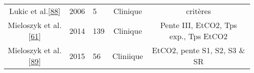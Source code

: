 \documentclass[12pt,]{article}
\begin{document}
\begin{landscape}
\begin{longtable}[]{@{}cllcc@{}}
\begin{minipage}[t]{0.31\columnwidth}\centering
Lukic et al.{[}\protect\hyperlink{ref-lukic2006novel}{88}{]}\strut
\end{minipage} & \begin{minipage}[t]{0.05\columnwidth}\raggedright
2006\strut
\end{minipage} & \begin{minipage}[t]{0.06\columnwidth}\raggedright
5\strut
\end{minipage} & \begin{minipage}[t]{0.12\columnwidth}\centering
Clinique\strut
\end{minipage} & \begin{minipage}[t]{0.32\columnwidth}\centering
18 critères\strut
\end{minipage}\tabularnewline
\begin{minipage}[t]{0.31\columnwidth}\centering
Mieloszyk et
al.{[}\protect\hyperlink{ref-mieloszyk2014automated}{61}{]}\strut
\end{minipage} & \begin{minipage}[t]{0.05\columnwidth}\raggedright
2014\strut
\end{minipage} & \begin{minipage}[t]{0.06\columnwidth}\raggedright
139\strut
\end{minipage} & \begin{minipage}[t]{0.12\columnwidth}\centering
Clinique\strut
\end{minipage} & \begin{minipage}[t]{0.32\columnwidth}\centering
Pente III, EtCO2, Tps exp., Tps EtCO2\strut
\end{minipage}\tabularnewline
\begin{minipage}[t]{0.31\columnwidth}\centering
Mieloszyk et
al.{[}\protect\hyperlink{ref-mieloszyk2015clustering}{89}{]}\strut
\end{minipage} & \begin{minipage}[t]{0.05\columnwidth}\raggedright
2015\strut
\end{minipage} & \begin{minipage}[t]{0.06\columnwidth}\raggedright
56\strut
\end{minipage} & \begin{minipage}[t]{0.12\columnwidth}\centering
Cliniique\strut
\end{minipage} & \begin{minipage}[t]{0.32\columnwidth}\centering
EtCO2, pente S1, S2, S3 \& SR\strut
\end{minipage}\tabularnewline

\end{longtable}
\end{landscape}
\end{document}
